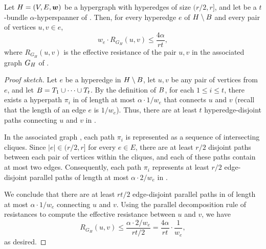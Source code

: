 \begin{lemma} \label{lem:effective_resistance}
Let \( { H} = (V, E, \boldsymbol{w}) \) be a hypergraph with hyperedges of size \( (r/2, r] \), and let  be a \( t \)-bundle \( \alpha \)-hyperspanner of .
Then, for every hyperedge \( e \) of \( { H} \setminus {\ensuremath{ B}} \) and every pair of vertices \( u,v \in e \),
\begin{equation*}
w_e \cdot R_{G_H}(u, v) \leq \frac{4 \alpha}{rt},
\end{equation*}
where \( R_{G_H}(u, v) \)  is the effective resistance of the pair \( u, v \) in the associated graph \( {G_{ H}} \) of .
\end{lemma}
\begin{proof}[Proof sketch]
Let \( e \) be a hyperedge in \( { H} \setminus {\ensuremath{ B}} \), let \(u, v\) be any pair of vertices from $e$, and let \( { B} = { T_1} \cup \dots \cup {\ensuremath{ T_t}} \).
By the definition of \( { B} \), for each \( 1 \leq i \leq t \), there exists a hyperpath \( \pi _i \) in  of length at most \( \alpha \cdot 1/ w_e \) that connects \( u \) and \( v \) (recall that the length of an edge \( e \) is \( 1/w_e \)).
Thus, there are at least \( t \) hyperedge-disjoint paths connecting \( u \) and \( v \) in .

In the associated graph , each path \( \pi _i \) is represented as a sequence of intersecting cliques.
Since \( |e| \in (r/2, r] \) for every \( e \in E \), there are at least \( r / 2 \) disjoint paths between each pair of vertices within the cliques, and each of these paths contain at most two edges.
Consequently, each path \( \pi _i \) represents at least \( r/2 \) edge-disjoint parallel paths of length at most \( \alpha \cdot 2/ w_e \) in .

We conclude that there are at least \( rt / 2 \) edge-disjoint parallel paths in  of length at most \( \alpha \cdot 1/ w_e \) connecting \( u \) and \( v \).
Using the parallel decomposition rule of resistances to compute the effective resistance between \( u \) and \( v \), we have
\begin{equation*}
R_{G_H}(u, v) \leq \frac{\alpha \cdot 2 / w_e}{rt / 2} = \frac{4 \alpha}{rt} \cdot \frac{1}{w_e},
\end{equation*}
as desired.
\end{proof}

